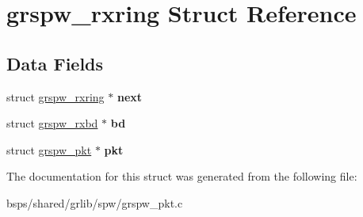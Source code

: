 \hypertarget{structgrspw__rxring}{}\section{grspw\+\_\+rxring Struct Reference}
\label{structgrspw__rxring}
\subsection*{Data Fields}
\begin{DoxyCompactItemize}
\item 
\mbox{\label{structgrspw__rxring_a2b19ea3c4ca94d05387fef2f388617dc}} 
struct \mbox{\hyperlink{structgrspw__rxring}{grspw\+\_\+rxring}} $\ast$ {\bfseries next}
\item 
\mbox{\label{structgrspw__rxring_a91406300f2d4934fa2445c368b13d9c6}} 
struct \mbox{\hyperlink{structgrspw__rxbd}{grspw\+\_\+rxbd}} $\ast$ {\bfseries bd}
\item 
\mbox{\label{structgrspw__rxring_a3c39b31d960324e5b5cfac22caa12fa1}} 
struct \mbox{\hyperlink{structgrspw__pkt}{grspw\+\_\+pkt}} $\ast$ {\bfseries pkt}
\end{DoxyCompactItemize}


The documentation for this struct was generated from the following file\+:\begin{DoxyCompactItemize}
\item 
bsps/shared/grlib/spw/grspw\+\_\+pkt.\+c\end{DoxyCompactItemize}
